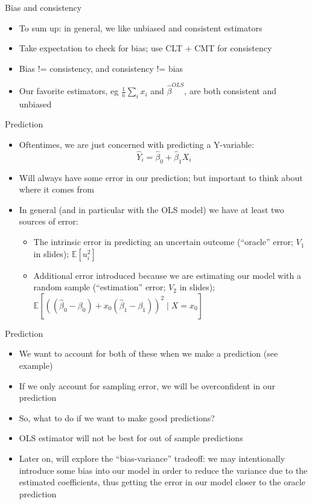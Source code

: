 \documentclass[aspectratio=169]{beamer}
\begin{document}
\begin{frame}{Bias and consistency}
    \begin{itemize}
        \item To sum up: in general, we like unbiased and consistent estimators
        \item Take expectation to check for bias; use CLT + CMT for consistency
        \item Bias != consistency, and consistency != bias
        \item Our favorite estimators, eg $\frac{1}{n} \sum_i x_i $ and $\hat{\beta}^{OLS}$, are both consistent and unbiased
    \end{itemize}
\end{frame}

\begin{frame}{Prediction}
    \begin{itemize}
        \item Oftentimes, we are just concerned with predicting a Y-variable:
        $$
            \hat{Y}_i = \hat{\beta}_0 + \hat{\beta}_1 X_i
        $$
        \item Will always have some error in our prediction; but important to think about where it comes from
        \item In general (and in particular with the OLS model) we have at least two sources of error:
        \begin{itemize}
            \item The intrinsic error in predicting an uncertain outcome (``oracle'' error; $V_1$ in slides); $\mathbb{E}[u_i^2]$
            \item Additional error introduced because we are estimating our model with a random sample (``estimation'' error; $V_2$ in slides); $\mathbb{E}\left[\left(\left(\hat{\beta}_0-\beta_0\right)+x_0\left(\hat{\beta}_1-\beta_1\right)\right)^2 \mid X=x_0\right]$
        \end{itemize}
    \end{itemize}
\end{frame}

\begin{frame}{Prediction}
    \begin{itemize}
        \item We want to account for both of these when we make a prediction (see example)
        \item If we only account for sampling error, we will be overconfident in our prediction 
        \item So, what to do if we want to make good predictions?
        \item OLS estimator will not be best for out of sample predictions
        \item Later on, will explore the ``bias-variance'' tradeoff: we may intentionally introduce some bias into our model in order to reduce the variance due to the estimated coefficients, thus getting the error in our model closer to the oracle prediction
    \end{itemize}
\end{frame}
\end{document}
